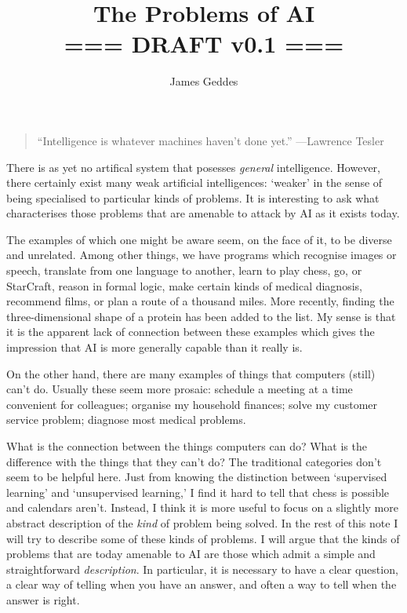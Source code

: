 \documentclass[10pt, a4, twocolumn]{article}
\title{The Problems of AI \\ === DRAFT v0.1 ===}
\author{James Geddes}
\begin{document}
\maketitle
\thispagestyle{empty}\pagestyle{empty}
\begin{quote}
``Intelligence is whatever machines haven't done yet.'' ---Lawrence Tesler
\end{quote}
There is as yet no artifical system that posesses \emph{general}
intelligence. However, there certainly exist many weak artificial intelligences:
`weaker' in the sense of being specialised to particular kinds of problems. It
is interesting to ask what characterises those problems that are amenable to
attack by AI as it exists today.

The examples of which one might be aware seem, on the face of it, to be diverse
and unrelated. Among other things, we have programs which recognise images or
speech, translate from one language to another, learn to play chess, go, or
StarCraft, reason in formal logic, make certain kinds of medical diagnosis,
recommend films, or plan a route of a thousand miles. More recently, finding the
three-dimensional shape of a protein has been added to the list. My sense is
that it is the apparent lack of connection between these examples which gives
the impression that AI is more generally capable than it really is.

On the other hand, there are many examples of things that computers (still)
can't do. Usually these seem more prosaic: schedule a meeting at a time
convenient for colleagues; organise my household finances; solve my customer
service problem; diagnose most medical problems.

What is the connection between the things computers can do? What is the
difference with the things that they can't do? The traditional categories don't
seem to be helpful here. Just from knowing the distinction between `supervised
learning' and `unsupervised learning,' I find it hard to tell that chess is
possible and calendars aren't. Instead, I think it is more useful to focus on a
slightly more abstract description of the \emph{kind} of problem being
solved. In the rest of this note I will try to describe some of these kinds of
problems. I will argue that the kinds of problems that are today amenable to AI
are those which admit a simple and straightforward \emph{description}. In
particular, it is necessary to have a clear question, a clear way of telling
when you have an answer, and often a way to tell when the answer is right. 
\end{document}
